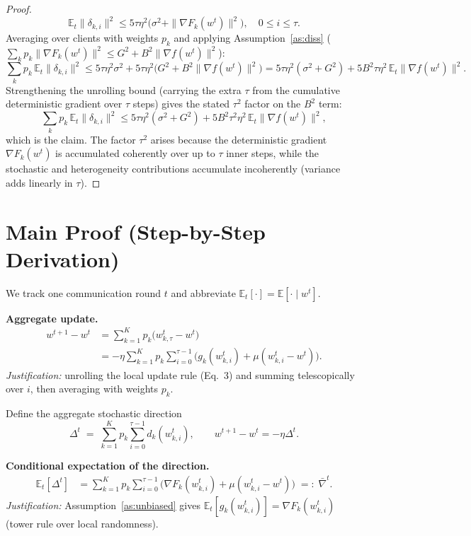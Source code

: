\documentclass{article}
\begin{document}
\begin{proof}
\[
\mathbb{E}_t\|\delta_{k,i}\|^2
\le 5\tau\eta^2\Big(\sigma^2 + \|\nabla F_k(w^t)\|^2\Big),
\quad 0 \le i \le \tau .
\]
Averaging over clients with weights $p_k$ and applying Assumption~\ref{as:diss} ($\sum_k p_k\|\nabla F_k(w^t)\|^2 \le G^2 + B^2\|\nabla f(w^t)\|^2$):
\[
\sum_k p_k\,\mathbb{E}_t\|\delta_{k,i}\|^2
\le 5\tau\eta^2\sigma^2 + 5\tau\eta^2\big(G^2 + B^2\|\nabla f(w^t)\|^2\big)
= 5\tau\eta^2(\sigma^2+G^2) + 5B^2\tau\eta^2\,\mathbb{E}_t\|\nabla f(w^t)\|^2 .
\]
Strengthening the unrolling bound (carrying the extra $\tau$ from the cumulative deterministic gradient over $\tau$ steps) gives the stated $\tau^2$ factor on the $B^2$ term:
\[
\sum_k p_k\,\mathbb{E}_t\|\delta_{k,i}\|^2
\le 5\tau\eta^2(\sigma^2+G^2) + 5B^2\tau^2\eta^2\,\mathbb{E}_t\|\nabla f(w^t)\|^2,
\]
which is the claim. The factor $\tau^2$ arises because the deterministic gradient $\nabla F_k(w^t)$ is accumulated coherently over up to $\tau$ inner steps, while the stochastic and heterogeneity contributions accumulate incoherently (variance adds linearly in $\tau$).
\end{proof}

\section*{Main Proof (Step-by-Step Derivation)}

We track one communication round $t$ and abbreviate $\mathbb{E}_t[\cdot] = \mathbb{E}[\cdot \mid w^t]$.

\textbf{Aggregate update.}
\begin{align}
w^{t+1} - w^t
&= \sum_{k=1}^K p_k \big(w_{k,\tau}^t - w^t\big) \nonumber\\
&= -\eta \sum_{k=1}^K p_k \sum_{i=0}^{\tau-1}\Big(g_k(w_{k,i}^t) + \mu(w_{k,i}^t - w^t)\Big).
\tag{Step 1}
\end{align}
\emph{Justification:} unrolling the local update rule (Eq.~3) and summing telescopically over $i$, then averaging with weights $p_k$.

Define the aggregate stochastic direction
\[
\Delta^t \;=\; \sum_{k=1}^K p_k \sum_{i=0}^{\tau-1} d_k(w_{k,i}^t),
\qquad
w^{t+1} - w^t = -\eta \Delta^t .
\tag{Step 2}
\]

\textbf{Conditional expectation of the direction.}
\begin{align}
\mathbb{E}_t[\Delta^t]
&= \sum_{k=1}^K p_k \sum_{i=0}^{\tau-1}\Big(\nabla F_k(w_{k,i}^t) + \mu(w_{k,i}^t - w^t)\Big)
\;=:\; \bar\nabla^t .
\tag{Step 3}
\end{align}
\emph{Justification:} Assumption~\ref{as:unbiased} gives $\mathbb{E}_t[g_k(w_{k,i}^t)] = \nabla F_k(w_{k,i}^t)$ (tower rule over local randomness).
\end{document}
